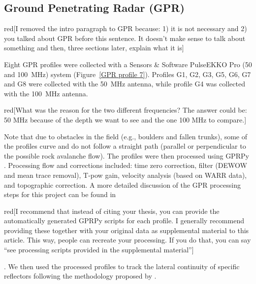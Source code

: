 \documentclass[5p]{elsarticle}
\newcommand{\alon}{\begin{color}{red}}
\newcommand{\aloff}{\end{color}}
\begin{document}
	\subsection{Ground Penetrating Radar (GPR)}
										
        \alon[I removed the intro paragraph to GPR because: 1) it is not necessary and 2) you talked about GPR before this sentence. It doesn't make sense to talk about something and then, three sections later, explain what it is]\aloff


Eight GPR profiles were collected with a Sensors \& Software PulseEKKO Pro (\num{50} and \SI{100}{\mega Hz}) system (Figure~\ref{GPR profile 7}). Profiles G1, G2, G3, G5, G6, G7 and G8 were collected with the \SI{50}{\mega Hz} antenna, while profile G4 was collected with the \SI{100}{\mega Hz} antenna. \alon [What was the reason for the two different frequencies? The answer could be: 50 MHz because of the depth we want to see and the one 100 MHz to compare.] \aloff Note that due to obstacles in the field (e.g., boulders and fallen trunks), some of the profiles curve and do not follow a straight path (parallel or perpendicular to the possible rock avalanche flow). The profiles were then processed using GPRPy \citep{plattner2019comunity}. Processing flow and corrections included: time zero correction, filter (DEWOW and mean trace removal), T-pow gain, velocity analysis (based on WARR data), and topographic correction. A more detailed discussion of the GPR processing steps for this project can be found in \cite{Pacheco2019geophysical} \alon [I recommend that instead of citing your thesis, you can provide the automatically generated GPRPy scripts for each profile. I generally recommend providing these together with your original data as supplemental material to this article. This way, people can recreate your processing. If you do that, you can say ``see processing scripts provided in the supplemental material''] \aloff. We then used the processed profiles to track the lateral continuity of specific reflectors following the methodology proposed by \citep{mitchum1977seismic}. 
\end{document}
